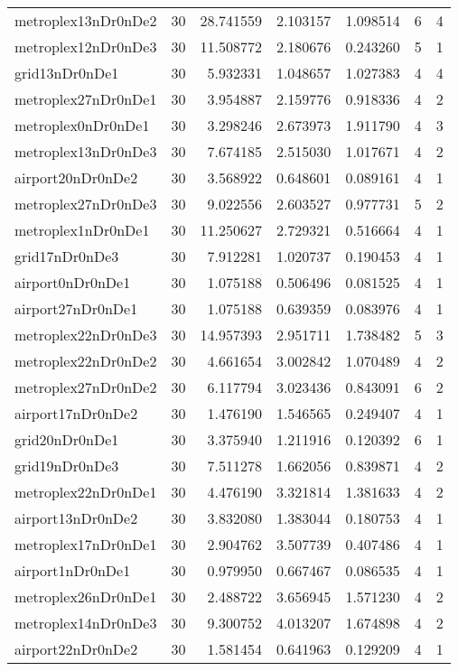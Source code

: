 \begin{longtable}{|l|r|r|r|r|r|r|}
metroplex13nDr0nDe2 & 30 & 28.741559 & 2.103157 & 1.098514 & 6 & 4 \\
metroplex12nDr0nDe3 & 30 & 11.508772 & 2.180676 & 0.243260 & 5 & 1 \\
grid13nDr0nDe1 & 30 & 5.932331 & 1.048657 & 1.027383 & 4 & 4 \\
metroplex27nDr0nDe1 & 30 & 3.954887 & 2.159776 & 0.918336 & 4 & 2 \\
metroplex0nDr0nDe1 & 30 & 3.298246 & 2.673973 & 1.911790 & 4 & 3 \\
metroplex13nDr0nDe3 & 30 & 7.674185 & 2.515030 & 1.017671 & 4 & 2 \\
airport20nDr0nDe2 & 30 & 3.568922 & 0.648601 & 0.089161 & 4 & 1 \\
metroplex27nDr0nDe3 & 30 & 9.022556 & 2.603527 & 0.977731 & 5 & 2 \\
metroplex1nDr0nDe1 & 30 & 11.250627 & 2.729321 & 0.516664 & 4 & 1 \\
grid17nDr0nDe3 & 30 & 7.912281 & 1.020737 & 0.190453 & 4 & 1 \\
airport0nDr0nDe1 & 30 & 1.075188 & 0.506496 & 0.081525 & 4 & 1 \\
airport27nDr0nDe1 & 30 & 1.075188 & 0.639359 & 0.083976 & 4 & 1 \\
metroplex22nDr0nDe3 & 30 & 14.957393 & 2.951711 & 1.738482 & 5 & 3 \\
metroplex22nDr0nDe2 & 30 & 4.661654 & 3.002842 & 1.070489 & 4 & 2 \\
metroplex27nDr0nDe2 & 30 & 6.117794 & 3.023436 & 0.843091 & 6 & 2 \\
airport17nDr0nDe2 & 30 & 1.476190 & 1.546565 & 0.249407 & 4 & 1 \\
grid20nDr0nDe1 & 30 & 3.375940 & 1.211916 & 0.120392 & 6 & 1 \\
grid19nDr0nDe3 & 30 & 7.511278 & 1.662056 & 0.839871 & 4 & 2 \\
metroplex22nDr0nDe1 & 30 & 4.476190 & 3.321814 & 1.381633 & 4 & 2 \\
airport13nDr0nDe2 & 30 & 3.832080 & 1.383044 & 0.180753 & 4 & 1 \\
metroplex17nDr0nDe1 & 30 & 2.904762 & 3.507739 & 0.407486 & 4 & 1 \\
airport1nDr0nDe1 & 30 & 0.979950 & 0.667467 & 0.086535 & 4 & 1 \\
metroplex26nDr0nDe1 & 30 & 2.488722 & 3.656945 & 1.571230 & 4 & 2 \\
metroplex14nDr0nDe3 & 30 & 9.300752 & 4.013207 & 1.674898 & 4 & 2 \\
airport22nDr0nDe2 & 30 & 1.581454 & 0.641963 & 0.129209 & 4 & 1 \\

\end{longtable}
